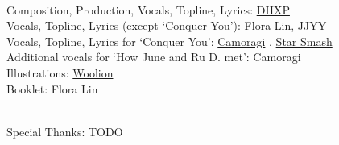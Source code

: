\documentclass{article}
\begin{document}
\phantom{*}\\
Composition, Production, Vocals, Topline, Lyrics: \href{https://linktr.ee/dhxp}{DHXP}\\
Vocals, Topline, Lyrics (except `Conquer You'): \href{https://www.youtube.com/channel/UC7pM7YKe9U1D1Xl4s_xroBw}{Flora Lin}, \href{https://soundcloud.com/okfeather}{JJYY} \\
Vocals, Topline, Lyrics for `Conquer You': \href{https://camoragi.bandcamp.com/}{Camoragi} , \href{https://soundcloud.com/starsmashofficial}{Star Smash} \\
Additional vocals for `How June and Ru D. met': Camoragi\\
Illustrations: \href{https://www.pixiv.net/en/users/6200150}{Woolion}\\
Booklet: Flora Lin

\phantom{*}\\
Special Thanks: TODO
\end{document}
